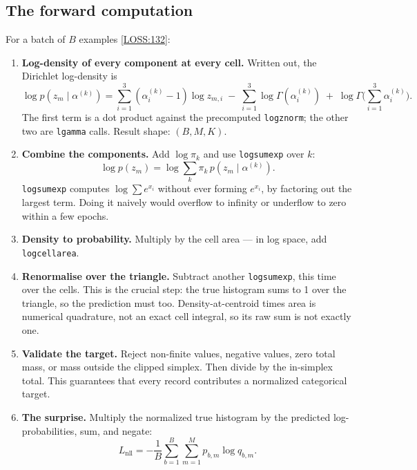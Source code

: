 \documentclass[11pt,a4paper]{report}
\newcommand{\srcbase}{vscode://file/Users/syellapa/Documents/Research/2026/ANSYS/Multi-ScalarPDF}
\newcommand{\dmdn}{dirichlet\string_mdn}
\newcommand{\srctag}[1]{{\footnotesize\textcolor{TagGray}{[#1]}}}
\newcommand{\LossL}[1]{\href{\srcbase/\dmdn/losses.py:#1}{\srctag{LOSS:#1}}}
\newcommand{\code}[1]{\texttt{#1}}
\renewcommand{\_}{\origtextunderscore\allowbreak}
\begin{document}
\subsection*{The forward computation}

For a batch of $B$ examples \LossL{132}:

\begin{enumerate}
  \item \textbf{Log-density of every component at every cell.} Written out, the Dirichlet
        log-density is
        \[
          \log p(z_m \mid \alpha^{(k)}) = \sum_{i=1}^{3}(\alpha^{(k)}_i - 1)\log z_{m,i}
            \;-\; \sum_{i=1}^{3}\log\Gamma(\alpha^{(k)}_i)
            \;+\; \log\Gamma\!\Big(\sum_{i=1}^{3}\alpha^{(k)}_i\Big).
        \]
        The first term is a dot product against the precomputed \code{log\_z\_norm}; the other
        two are \code{lgamma} calls. Result shape: $(B, M, K)$.
  \item \textbf{Combine the components.} Add $\log \pi_k$ and use \code{logsumexp} over $k$:
        \[
          \log p(z_m) = \log \sum_k \pi_k\, p(z_m \mid \alpha^{(k)}) .
        \]
        \code{logsumexp} computes $\log \sum e^{x_i}$ without ever forming $e^{x_i}$, by
        factoring out the largest term. Doing it naively would overflow to infinity or
        underflow to zero within a few epochs.
  \item \textbf{Density to probability.} Multiply by the cell area --- in log space, add
        \code{log\_cell\_area}.
  \item \textbf{Renormalise over the triangle.} Subtract another \code{logsumexp}, this time
        over the cells. This is the crucial step: the true histogram sums to 1 over the
        triangle, so the prediction must too. Density-at-centroid times area is numerical
        quadrature, not an exact cell integral, so its raw sum is not exactly one.
  \item \textbf{Validate the target.} Reject non-finite values, negative values, zero total
        mass, or mass outside the clipped simplex. Then divide by the in-simplex total. This
        guarantees that every record contributes a normalized categorical target.
  \item \textbf{The surprise.} Multiply the normalized true histogram by the predicted log-probabilities,
        sum, and negate:
        \[
          L_{\text{nll}} = -\frac{1}{B}\sum_{b=1}^{B}\sum_{m=1}^{M} p_{b,m} \log q_{b,m} .
        \]
\end{enumerate}
\end{document}
